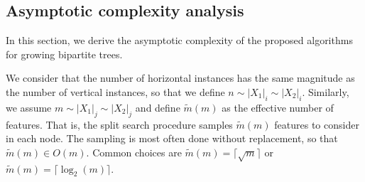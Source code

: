 
%
%
%

\subsection{Asymptotic complexity analysis}
\label{sec:complexity_analysis}


In this section, we derive the asymptotic complexity of the proposed algorithms for growing bipartite trees.

We consider that the number of horizontal instances has the same magnitude as the number of vertical instances, so that we define $n \sim |X_1|_i \sim |X_2|_i$.
Similarly, we assume $m \sim |X_1|_j \sim |X_2|_j$ and define $\tilde m(m)$ as the effective number of features. That is, the split search procedure samples $\tilde m(m)$ features to consider in each node. The sampling is most often done without replacement, so that $\tilde m(m) \in O(m)$. Common choices are $\tilde m (m) = \lceil\sqrt{m}\rceil$ or $\tilde m (m) = \lceil \log_2(m) \rceil$.

